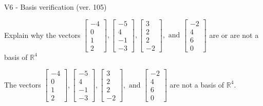 \begin{exercise}
  \begin{exerciseTitle}V6 - Basis verification (ver. 105)\end{exerciseTitle}
  \begin{exerciseStatement}
    Explain why the vectors \(\left[\begin{array}{r}
-4 \\
0 \\
1 \\
2
\end{array}\right] , \left[\begin{array}{r}
-5 \\
4 \\
-1 \\
-3
\end{array}\right] , \left[\begin{array}{r}
3 \\
2 \\
2 \\
-2
\end{array}\right] , \text{ and } \left[\begin{array}{r}
-2 \\
4 \\
6 \\
0
\end{array}\right]\) are or are not a basis of \(\mathbb{R}^4\)	


  \end{exerciseStatement}
  \begin{exerciseAnswer}
   The vectors \(\left[\begin{array}{r}
-4 \\
0 \\
1 \\
2
\end{array}\right] , \left[\begin{array}{r}
-5 \\
4 \\
-1 \\
-3
\end{array}\right] , \left[\begin{array}{r}
3 \\
2 \\
2 \\
-2
\end{array}\right] , \text{ and } \left[\begin{array}{r}
-2 \\
4 \\
6 \\
0
\end{array}\right]\) 
  	 are not  a basis of \(\mathbb{R}^4\).
  


  \end{exerciseAnswer}
\end{exercise}